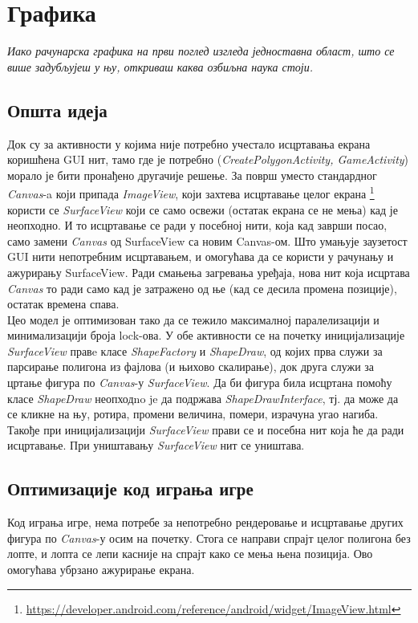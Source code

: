 
\chapter{Графика} \label{Graphics}

\emph{Иако рачунарска графика на први поглед изгледа једноставна област, што се више задубљујеш у њу, откриваш каква озбиљна наука стоји. }

\section{Општа идеја}
Док су за активности у којима није потребно учестало исцртавања екрана коришћена GUI нит, тамо где је потребно (\emph{CreatePolygonActivity, GameActivity}) морало је бити пронађено другачије решење. За површ уместо стандардног \emph{Canvas}-a који припада \emph{ImageView}, који захтева исцртавање целог екрана \footnote{\url{https://developer.android.com/reference/android/widget/ImageView.html}} користи се \emph{SurfaceView} који се само освежи (остатак екрана се не мења) кад је неопходно. И то исцртавање се ради у посебној нити, која кад заврши посао, само замени \emph{Canvas} од SurfaceView са новим Canvas-ом. Што умањује заузетост GUI нити непотребним исцртавањем, и омогућава да се користи у рачунању и ажурирању SurfaceView.
Ради смањења загревања уређаја, нова нит која исцртава \emph{Canvas} то ради само кад је затражено од ње (кад се десила промена позиције), остатак времена спава. 
\\ \indent
 Цео модел је оптимизован тако да се тежило максималној паралелизацији и минимализацији броја lock-ова. У обе активности се на почетку иницијализације \emph{SurfaceView} правe класе \emph{ShapeFactory} и \emph{ShapeDraw}, од којих прва служи за парсирање полигона из фајлова (и њихово скалирање), док друга служи за цртање фигура по \emph{Canvas}-у \emph{SurfaceView}. Да би фигура била исцртана помоћу класе \emph{ShapeDraw} неопходno je да подржава \emph{ShapeDrawInterface}, тј. да може да се кликне на њу, ротира, промени величина, помери, израчуна угао нагиба. Такође при иницијализацији \emph{SurfaceView} прави се и посебна нит која ће да ради исцртавање. При уништавању \emph{SurfaceView} нит се уништава.
\section{Оптимизације код играња игре}
 Код играња игре, нема потребе за непотребно рендеровање и исцртавање других фигура по \emph{Canvas}-у осим на почетку. Стога се направи спрајт целог полигона без лопте, и лопта се лепи касније на спрајт како се мења њена позиција. Ово омогућава убрзано ажурирање екрана.